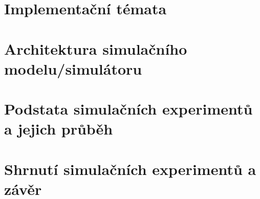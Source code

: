\documentclass[12pt,a4paper,titlepage]{article}
\begin{document}
\section{Implementační témata}
\section{Architektura simulačního modelu/simulátoru}
\section{Podstata simulačních experimentů a jejich průběh}
\section{Shrnutí simulačních experimentů a závěr}
\end{document}
